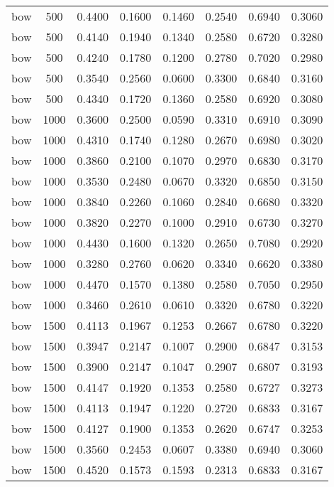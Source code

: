 \begin{table}[h!]
\begin{tabularx}{\textwidth}{cccccccc}
		bow      & 500  & 0.4400 & 0.1600 & 0.1460 & 0.2540 & 0.6940 & 0.3060 \\
		bow      & 500  & 0.4140 & 0.1940 & 0.1340 & 0.2580 & 0.6720 & 0.3280 \\
		bow      & 500  & 0.4240 & 0.1780 & 0.1200 & 0.2780 & 0.7020 & 0.2980 \\
		bow      & 500  & 0.3540 & 0.2560 & 0.0600 & 0.3300 & 0.6840 & 0.3160 \\
		bow      & 500  & 0.4340 & 0.1720 & 0.1360 & 0.2580 & 0.6920 & 0.3080 \\
		bow      & 1000 & 0.3600 & 0.2500 & 0.0590 & 0.3310 & 0.6910 & 0.3090 \\
		bow      & 1000 & 0.4310 & 0.1740 & 0.1280 & 0.2670 & 0.6980 & 0.3020 \\
		bow      & 1000 & 0.3860 & 0.2100 & 0.1070 & 0.2970 & 0.6830 & 0.3170 \\
		bow      & 1000 & 0.3530 & 0.2480 & 0.0670 & 0.3320 & 0.6850 & 0.3150 \\
		bow      & 1000 & 0.3840 & 0.2260 & 0.1060 & 0.2840 & 0.6680 & 0.3320 \\
		bow      & 1000 & 0.3820 & 0.2270 & 0.1000 & 0.2910 & 0.6730 & 0.3270 \\
		bow      & 1000 & 0.4430 & 0.1600 & 0.1320 & 0.2650 & 0.7080 & 0.2920 \\
		bow      & 1000 & 0.3280 & 0.2760 & 0.0620 & 0.3340 & 0.6620 & 0.3380 \\
		bow      & 1000 & 0.4470 & 0.1570 & 0.1380 & 0.2580 & 0.7050 & 0.2950 \\
		bow      & 1000 & 0.3460 & 0.2610 & 0.0610 & 0.3320 & 0.6780 & 0.3220 \\
		bow      & 1500 & 0.4113 & 0.1967 & 0.1253 & 0.2667 & 0.6780 & 0.3220 \\
		bow      & 1500 & 0.3947 & 0.2147 & 0.1007 & 0.2900 & 0.6847 & 0.3153 \\
		bow      & 1500 & 0.3900 & 0.2147 & 0.1047 & 0.2907 & 0.6807 & 0.3193 \\
		bow      & 1500 & 0.4147 & 0.1920 & 0.1353 & 0.2580 & 0.6727 & 0.3273 \\
		bow      & 1500 & 0.4113 & 0.1947 & 0.1220 & 0.2720 & 0.6833 & 0.3167 \\
		bow      & 1500 & 0.4127 & 0.1900 & 0.1353 & 0.2620 & 0.6747 & 0.3253 \\
		bow      & 1500 & 0.3560 & 0.2453 & 0.0607 & 0.3380 & 0.6940 & 0.3060 \\
		bow      & 1500 & 0.4520 & 0.1573 & 0.1593 & 0.2313 & 0.6833 & 0.3167 \\

\end{tabularx}
\end{table}
